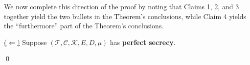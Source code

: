 \vskip 0.5cm
\noindent
We now complete this direction of the proof by noting that Claims 1, 2, and 3
together yield the two bullets in the Theorem's conclusions, while Claim 4 yields
the ``furthermore'' part of the Theorem's conclusions.

\vskip 1.0cm
\noindent
\underline{($\Longleftarrow$)}\quad
Suppose $(\mathcal{T},\mathcal{C},\mathcal{K},E,D,\mu)$
has \textbf{perfect secrecy}.

\qed

